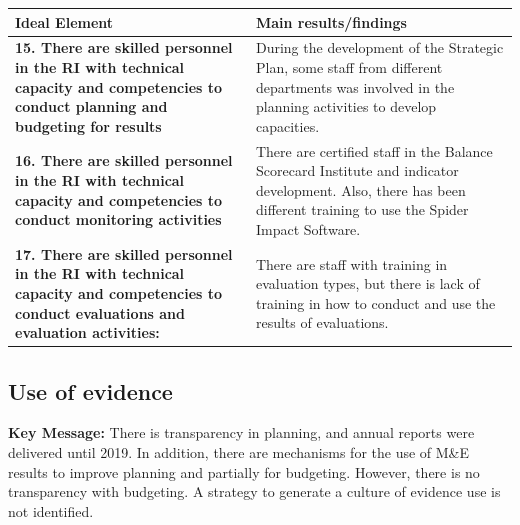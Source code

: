 \documentclass[
  10pt,
]{book}
\begin{document}
\begin{tabu} to 
\hline
Ideal Element & Main results/findings\\
\hline
\textbf{15. There are skilled personnel in the RI with technical capacity and competencies to conduct planning and budgeting for results} & During the development of the Strategic Plan, some staff from different departments was involved in the planning activities to develop capacities. \\
\hline
\textbf{16. There are skilled personnel in the RI with technical capacity and competencies to conduct monitoring activities} & There are certified staff in the Balance Scorecard Institute and indicator development. Also, there has been different training to use the  Spider Impact Software.\\
\hline
\textbf{17. There are skilled personnel in the RI with technical capacity and competencies to conduct evaluations and evaluation activities:} & There are staff with training in evaluation types, but there is lack of training in how to conduct and use the results of evaluations.\\
\hline
\end{tabu}
\endgroup{}

\hypertarget{use-of-evidence}{%
\subsection{Use of evidence}\label{use-of-evidence}}

\textbf{Key Message:}
There is transparency in planning, and annual reports were delivered until 2019. In addition, there are mechanisms for the use of M\&E results to improve planning and partially for budgeting. However, there is no transparency with budgeting. A strategy to generate a culture of evidence use is not identified.

\begingroup\fontsize{12}{14}\selectfont
\end{document}
